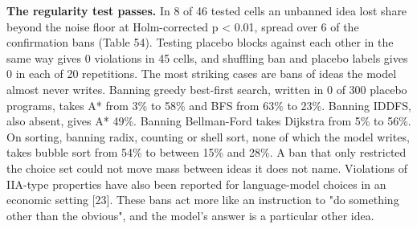 \documentclass[11pt,letterpaper]{article}
\begin{document}
\textbf{The regularity test passes.} In 8 of 46 tested cells an unbanned idea lost share beyond the noise floor at Holm-corrected p \textless{} 0.01, spread over 6 of the confirmation bans (Table 54). Testing placebo blocks against each other in the same way gives 0 violations in 45 cells, and shuffling ban and placebo labels gives 0 in each of 20 repetitions. The most striking cases are bans of ideas the model almost never writes. Banning greedy best-first search, written in 0 of 300 placebo programs, takes A* from 3\% to 58\% and BFS from 63\% to 23\%. Banning IDDFS, also absent, gives A* 49\%. Banning Bellman-Ford takes Dijkstra from 5\% to 56\%. On sorting, banning radix, counting or shell sort, none of which the model writes, takes bubble sort from 54\% to between 15\% and 28\%. A ban that only restricted the choice set could not move mass between ideas it does not name. Violations of IIA-type properties have also been reported for language-model choices in an economic setting [23]. These bans act more like an instruction to "do something other than the obvious", and the model's answer is a particular other idea.
\end{document}
